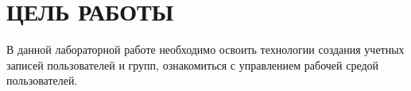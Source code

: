 \section{ЦЕЛЬ РАБОТЫ}

В данной лабораторной работе необходимо освоить технологии создания
учетных записей пользователей и групп, ознакомиться с управлением рабочей
средой пользователей.

\newpage
